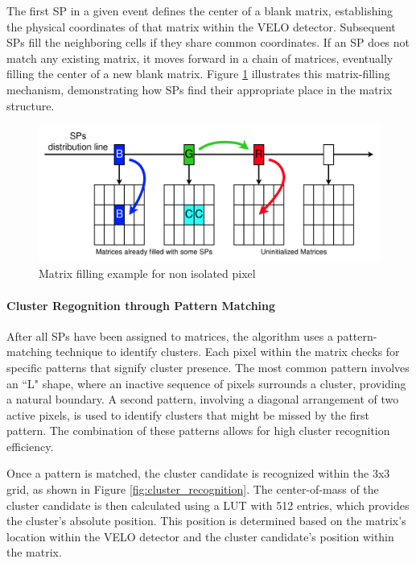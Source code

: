 The first SP in a given event defines the center of a blank matrix, establishing the physical coordinates of that matrix within the VELO detector. Subsequent SPs fill the neighboring cells if they share common coordinates. If an SP does not match any existing matrix, it moves forward in a chain of matrices, eventually filling the center of a new blank matrix. Figure \ref{fig:matrix_filling_clustering} illustrates this matrix-filling mechanism, demonstrating how SPs find their appropriate place in the matrix structure.
\begin{figure}
    \centering
    \includegraphics[width=\textwidth]{figures/matrix_filling_clustering.png}
    \caption{Matrix filling example for non isolated pixel}
    \label{fig:matrix_filling_clustering}
\end{figure}

\paragraph{Cluster Regognition through Pattern Matching}
After all SPs have been assigned to matrices, the algorithm uses a pattern-matching technique to identify clusters. Each pixel within the matrix checks for specific patterns that signify cluster presence. The most common pattern involves an ``L" shape, where an inactive sequence of pixels surrounds a cluster, providing a natural boundary. A second pattern, involving a diagonal arrangement of two active pixels, is used to identify clusters that might be missed by the first pattern. The combination of these patterns allows for high cluster recognition efficiency.

Once a pattern is matched, the cluster candidate is recognized within the 3x3 grid, as shown in Figure \ref{fig:cluster_recognition}. The center-of-mass of the cluster candidate is then calculated using a LUT with 512 entries, which provides the cluster's absolute position. This position is determined based on the matrix's location within the VELO detector and the cluster candidate's position within the matrix.

